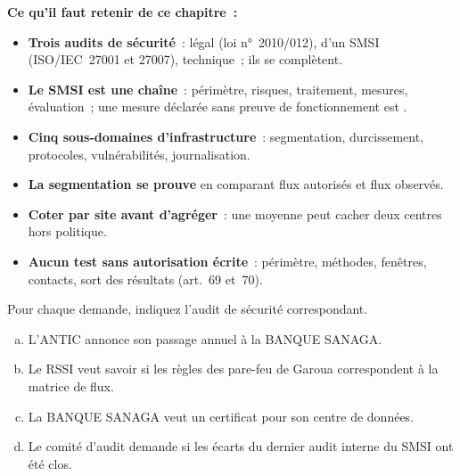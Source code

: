 
\separateur

\begin{boxresume}
\textbf{Ce qu'il faut retenir de ce chapitre~:}
\begin{itemize}
    \item \textbf{Trois audits de sécurité}~: légal (loi n°~2010/012),
          d'un SMSI (ISO/IEC~27001 et 27007), technique~; ils se
          complètent.
    \item \textbf{Le SMSI est une chaîne}~: périmètre, risques, traitement,
          mesures, évaluation~; une mesure déclarée sans preuve de
          fonctionnement est \NEK{}.
    \item \textbf{Cinq sous-domaines d'infrastructure}~: segmentation,
          durcissement, protocoles, vulnérabilités, journalisation.
    \item \textbf{La segmentation se prouve} en comparant flux autorisés et
          flux observés.
    \item \textbf{Coter par site avant d'agréger}~: une moyenne peut cacher
          deux centres hors politique.
    \item \textbf{Aucun test sans autorisation écrite}~: périmètre, méthodes,
          fenêtres, contacts, sort des résultats (art.~69 et~70).
\end{itemize}
\end{boxresume}

\bigskip

\begin{boxexo}[title={\ding{45}\quad Exercice~16.1. Quel audit~? \niveaubase}]
Pour chaque demande, indiquez l'audit de sécurité correspondant.
\begin{enumerate}[(a)]
    \item L'ANTIC annonce son passage annuel à la BANQUE SANAGA.
    \item Le RSSI veut savoir si les règles des pare-feu de Garoua
          correspondent à la matrice de flux.
    \item La BANQUE SANAGA veut un certificat pour son centre de données.
    \item Le comité d'audit demande si les écarts du dernier audit interne
          du SMSI ont été clos.
\end{enumerate}
\end{boxexo}

